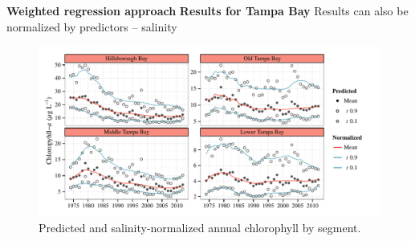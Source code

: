 \documentclass[serif]{beamer}\usepackage[]{graphicx}\usepackage[]{color}
\begin{document}
\begin{frame}{\textbf{Weighted regression approach}}{\textbf{ Results for Tampa Bay}}
Results can also be normalized by predictors -- salinity
\begin{figure}[!ht]


{\centering \includegraphics[width=\linewidth]{fig//prednrm} 

}

\caption[Predicted and salinity-normalized annual chlorophyll by segment]{Predicted and salinity-normalized annual chlorophyll by segment.\label{fig:/prednrm}}
\end{figure}


\end{frame}
\end{document}
